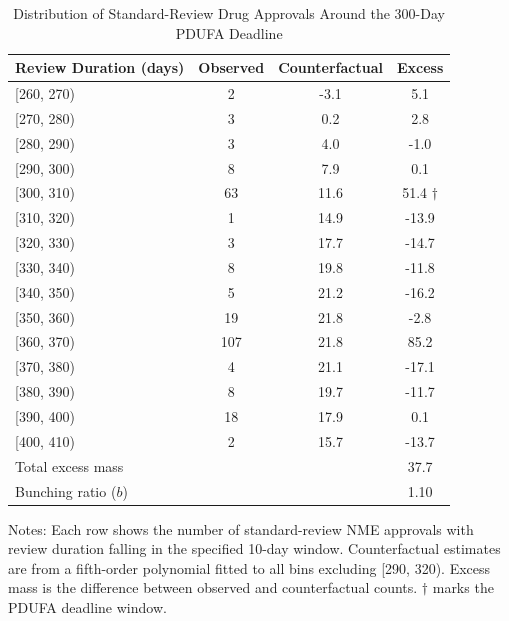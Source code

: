 \begin{table}[H]
\centering
\caption{Distribution of Standard-Review Drug Approvals Around the 300-Day PDUFA Deadline}
\begin{threeparttable}
\begin{tabular}{lccc}
\toprule
Review Duration (days) & Observed & Counterfactual & Excess \\
\midrule
{[}260, 270) & 2 & -3.1 & 5.1 \\
{[}270, 280) & 3 & 0.2 & 2.8 \\
{[}280, 290) & 3 & 4.0 & -1.0 \\
{[}290, 300) & 8 & 7.9 & 0.1 \\
{[}300, 310) & 63 & 11.6 & 51.4 $\dagger$ \\
{[}310, 320) & 1 & 14.9 & -13.9 \\
{[}320, 330) & 3 & 17.7 & -14.7 \\
{[}330, 340) & 8 & 19.8 & -11.8 \\
{[}340, 350) & 5 & 21.2 & -16.2 \\
{[}350, 360) & 19 & 21.8 & -2.8 \\
{[}360, 370) & 107 & 21.8 & 85.2 \\
{[}370, 380) & 4 & 21.1 & -17.1 \\
{[}380, 390) & 8 & 19.7 & -11.7 \\
{[}390, 400) & 18 & 17.9 & 0.1 \\
{[}400, 410) & 2 & 15.7 & -13.7 \\
\midrule
Total excess mass & & & 37.7 \\
Bunching ratio ($b$) & & & 1.10 \\
\bottomrule
\end{tabular}
\begin{tablenotes}[flushleft]
\small
\item Notes: Each row shows the number of standard-review NME approvals with review duration falling in the specified 10-day window. Counterfactual estimates are from a fifth-order polynomial fitted to all bins excluding [290, 320). Excess mass is the difference between observed and counterfactual counts. $\dagger$ marks the PDUFA deadline window.
\end{tablenotes}
\end{threeparttable}
\label{tab:bunching}
\end{table}
